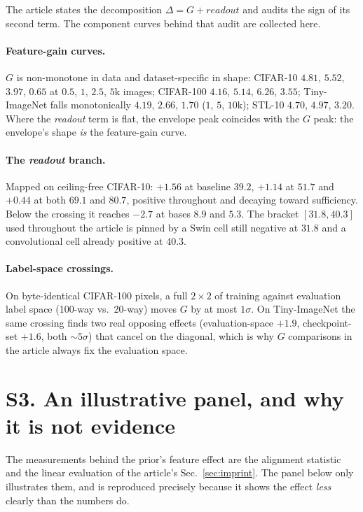 \documentclass[11pt]{article}
\newcommand{\readout}{\textit{readout}}
\begin{document}
The article states the decomposition $\Delta = G + \readout$ and audits
the sign of its second term. The component curves behind that audit are
collected here.

\paragraph{Feature-gain curves.} $G$ is non-monotone in data and
dataset-specific in shape: CIFAR-10 $4.81$, $5.52$, $3.97$, $0.65$ at $0.5$,
$1$, $2.5$, $5$k images; CIFAR-100 $4.16$, $5.14$, $6.26$, $3.55$;
Tiny-ImageNet falls monotonically $4.19$, $2.66$, $1.70$ ($1$, $5$, $10$k);
STL-10 $4.70$, $4.97$, $3.20$. Where the \readout{} term is flat, the envelope
peak coincides with the $G$ peak: the envelope's shape \emph{is} the
feature-gain curve.

\paragraph{The \readout{} branch.} Mapped on ceiling-free CIFAR-10: $+1.56$ at
baseline $39.2$, $+1.14$ at $51.7$ and $+0.44$ at both $69.1$ and $80.7$,
positive throughout and decaying toward sufficiency. Below the crossing it
reaches $-2.7$ at bases $8.9$ and $5.3$. The bracket $[31.8, 40.3]$ used
throughout the article is pinned by a Swin cell still negative at $31.8$ and a
convolutional cell already positive at $40.3$.

\paragraph{Label-space crossings.} On byte-identical CIFAR-100 pixels, a full
$2{\times}2$ of training against evaluation label space (100-way vs.\ 20-way)
moves $G$ by at most $1\sigma$. On Tiny-ImageNet the same crossing finds two
real opposing effects (evaluation-space $+1.9$, checkpoint-set $+1.6$, both
${\sim}5\sigma$) that cancel on the diagonal, which is why $G$ comparisons in
the article always fix the evaluation space.

\section*{S3. An illustrative panel, and why it is not evidence}

The measurements behind the prior's feature effect are the alignment statistic
and the linear evaluation of the article's Sec.~\ref{sec:imprint}. The panel below only
illustrates them, and is reproduced precisely because it shows the effect
\emph{less} clearly than the numbers do.
\end{document}
